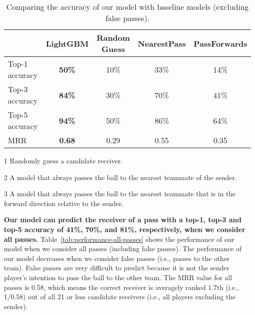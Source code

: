 \begin{table}[!t]
\caption{Comparing the accuracy of our model with baseline models (excluding false passes).}
\centering
\renewcommand{\tabcolsep}{3pt}
\begin{threeparttable}
\begin{tabular}{lcccc}
  \toprule
  & LightGBM & Random Guess\tnote{1} & NearestPass\tnote{2} & PassForwards\tnote{3} \\
  \midrule
  Top-1 accuracy & \textbf{50\%} & 10\% & 33\% & 14\% \\
  Top-3 accuracy & \textbf{84\%} & 30\% & 70\% & 41\% \\
  Top-5 accuracy & \textbf{94\%} & 50\% & 86\% & 64\% \\
  MRR & \textbf{0.68} & 0.29 & 0.55 & 0.35 \\
  \bottomrule
\end{tabular}
\begin{tablenotes}
\item[1] Randomly guess a candidate receiver.
\item[2] A model that always passes the ball to the nearest teammate of the sender.
\item[3] A model that always passes the ball to the nearest teammate that is in the forward direction relative to the sender.
\end{tablenotes}
\end{threeparttable}
\label{tab:comparing-performance-accurate-passes}
\end{table}

\textbf{Our model can predict the receiver of a pass with a top-1, top-3 and top-5 accuracy of 41\%, 70\%, and 81\%, respectively, when we consider all passes.}
Table~\ref{tab:performance-all-passes} shows the performance of our model when we consider all passes (including false passes). 
The performance of our model decreases when we consider false passes (i.e., passes to the other team). 
False passes are very difficult to predict because it is not the sender player's intention to pass the ball to the other team. 
The MRR value for all passes is 0.58, which means the correct receiver is averagely ranked $1.7$th (i.e., 1/0.58) out of all 21 or less candidate receivers (i.e., all players excluding the sender).

